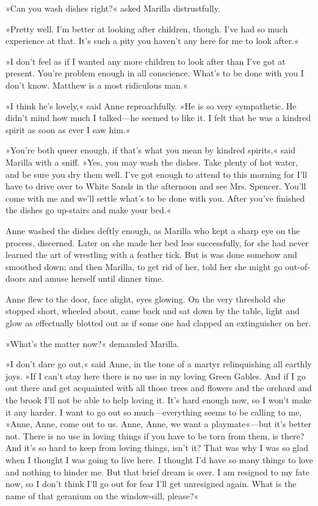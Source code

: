 »Can you wash dishes right?« asked Marilla distrustfully.

»Pretty well. I'm better at looking after children, though. I've had so much experience at that. It's such a pity you haven't any here for me to look after.«

»I don't feel as if I wanted any more children to look after than I've got at present. You're problem enough in all conscience. What's to be done with you I don't know. Matthew is a most ridiculous man.«

»I think he's lovely,« said Anne reproachfully. »He is so very sympathetic. He didn't mind how much I talked—he seemed to like it. I felt that he was a kindred spirit as soon as ever I saw him.«

»You're both queer enough, if that's what you mean by kindred spirits,« said Marilla with a sniff. »Yes, you may wash the dishes. Take plenty of hot water, and be sure you dry them well. I've got enough to attend to this morning for I'll have to drive over to White Sands in the afternoon and see Mrs. Spencer. You'll come with me and we'll settle what's to be done with you. After you've finished the dishes go up-stairs and make your bed.«

Anne washed the dishes deftly enough, as Marilla who kept a sharp eye on the process, discerned. Later on she made her bed less successfully, for she had never learned the art of wrestling with a feather tick. But is was done somehow and smoothed down; and then Marilla, to get rid of her, told her she might go out-of-doors and amuse herself until dinner time.

Anne flew to the door, face alight, eyes glowing. On the very threshold she stopped short, wheeled about, came back and sat down by the table, light and glow as effectually blotted out as if some one had clapped an extinguisher on her.

»What's the matter now?« demanded Marilla.

»I don't dare go out,« said Anne, in the tone of a martyr relinquishing all earthly joys. »If I can't stay here there is no use in my loving Green Gables. And if I go out there and get acquainted with all those trees and flowers and the orchard and the brook I'll not be able to help loving it. It's hard enough now, so I won't make it any harder. I want to go out so much—everything seems to be calling to me, »Anne, Anne, come out to us. Anne, Anne, we want a playmate«—but it's better not. There is no use in loving things if you have to be torn from them, is there? And it's so hard to keep from loving things, isn't it? That was why I was so glad when I thought I was going to live here. I thought I'd have so many things to love and nothing to hinder me. But that brief dream is over. I am resigned to my fate now, so I don't think I'll go out for fear I'll get unresigned again. What is the name of that geranium on the window-sill, please?«

